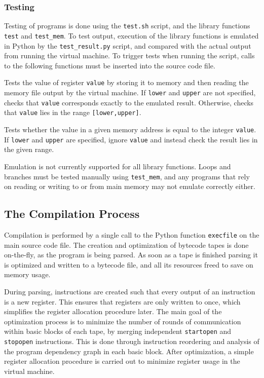 \begin{mylisting}
\subsubsection{Testing}

Testing of programs is done using the \verb|test.sh| script, and the library
functions \verb|test| and \verb|test_mem|. To test output, execution of the
library functions is emulated in Python by the \verb|test_result.py| script,
and compared with the actual output from running the virtual machine.
To trigger tests when running the script, calls to the following functions
must be inserted into the source code file.

Tests the value of register \verb|value| by storing it to memory and then
reading the memory file output by the virtual machine. If \verb|lower| and
\verb|upper| are
not specified, checks that \verb|value| corresponds exactly to the emulated
result. Otherwise, checks that \verb|value| lies in the range
\verb|[lower,upper]|.

Tests whether the value in a given memory address is equal to the integer
\verb|value|. If \verb|lower| and \verb|upper| are specified, ignore \verb|value|
and instead check the result lies in the given range.

Emulation is not currently supported for all library functions. Loops and
branches must be tested manually using \verb|test_mem|, and any programs that
rely on reading or writing to or from main memory may not emulate correctly
either.

\subsection{The Compilation Process}
Compilation is performed by a single call to the Python function
\verb|execfile| on the main source code file. The creation and optimization
of bytecode tapes is done on-the-fly, as the program is being parsed. As soon
as a tape is finished parsing it is optimized and written to a bytecode
file, and all its resources freed to save on memory usage.

During parsing, instructions are created such that every output of an
instruction is a new register. This ensures that registers are only written to
once, which simplifies the register allocation procedure later.
The main goal of the optimization process is to minimize the number of rounds
of communication within basic blocks of each tape, by merging independent
\verb|startopen| and \verb|stopopen| instructions. This is done through
instruction reordering and analysis of the program dependency graph in
each basic block. After optimization, a simple register allocation procedure
is carried out to minimize register usage in the virtual machine.


\end{mylisting}
